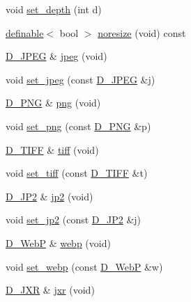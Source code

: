 \begin{DoxyCompactItemize}
\item 
void \hyperlink{class_photo_finish_1_1_destination_aeb48c03cc9c2054e4b8f0371ca552269}{set\+\_\+depth} (int d)
\item 
\hyperlink{class_photo_finish_1_1definable}{definable}$<$ bool $>$ \hyperlink{class_photo_finish_1_1_destination_a3ce775300f3de5f1808c49ca751c8634}{noresize} (void) const
\item 
\hyperlink{class_photo_finish_1_1_d___j_p_e_g}{D\+\_\+\+J\+P\+EG} \& \hyperlink{class_photo_finish_1_1_destination_a1e30d58e017120973de516de2336fe59}{jpeg} (void)
\item 
void \hyperlink{class_photo_finish_1_1_destination_a9192f76901154ac8c02c33b3906d9bcf}{set\+\_\+jpeg} (const \hyperlink{class_photo_finish_1_1_d___j_p_e_g}{D\+\_\+\+J\+P\+EG} \&j)
\item 
\hyperlink{class_photo_finish_1_1_d___p_n_g}{D\+\_\+\+P\+NG} \& \hyperlink{class_photo_finish_1_1_destination_a807b19552328aea3de3f882980dcdefb}{png} (void)
\item 
void \hyperlink{class_photo_finish_1_1_destination_a9411b9217ea9ad77dee22876da5dfa7d}{set\+\_\+png} (const \hyperlink{class_photo_finish_1_1_d___p_n_g}{D\+\_\+\+P\+NG} \&p)
\item 
\hyperlink{class_photo_finish_1_1_d___t_i_f_f}{D\+\_\+\+T\+I\+FF} \& \hyperlink{class_photo_finish_1_1_destination_a83342de96daf9534150e25200e8b79a9}{tiff} (void)
\item 
void \hyperlink{class_photo_finish_1_1_destination_ad594b4d9178266e83f1e189f24febe1f}{set\+\_\+tiff} (const \hyperlink{class_photo_finish_1_1_d___t_i_f_f}{D\+\_\+\+T\+I\+FF} \&t)
\item 
\hyperlink{class_photo_finish_1_1_d___j_p2}{D\+\_\+\+J\+P2} \& \hyperlink{class_photo_finish_1_1_destination_a79f99dbcb84412f861c8bc2bbf1e1c6d}{jp2} (void)
\item 
void \hyperlink{class_photo_finish_1_1_destination_af74d0894b5f287930f3d1fc274da87a3}{set\+\_\+jp2} (const \hyperlink{class_photo_finish_1_1_d___j_p2}{D\+\_\+\+J\+P2} \&j)
\item 
\hyperlink{class_photo_finish_1_1_d___web_p}{D\+\_\+\+WebP} \& \hyperlink{class_photo_finish_1_1_destination_a25ae0538f3848cc1398e8b2c319b32b4}{webp} (void)
\item 
void \hyperlink{class_photo_finish_1_1_destination_acbc12929ca361ed745f3dca3aad9d376}{set\+\_\+webp} (const \hyperlink{class_photo_finish_1_1_d___web_p}{D\+\_\+\+WebP} \&w)
\item 
\hyperlink{class_photo_finish_1_1_d___j_x_r}{D\+\_\+\+J\+XR} \& \hyperlink{class_photo_finish_1_1_destination_a90030e65830659b6da72d1d66370dfbc}{jxr} (void)

\end{DoxyCompactItemize}

